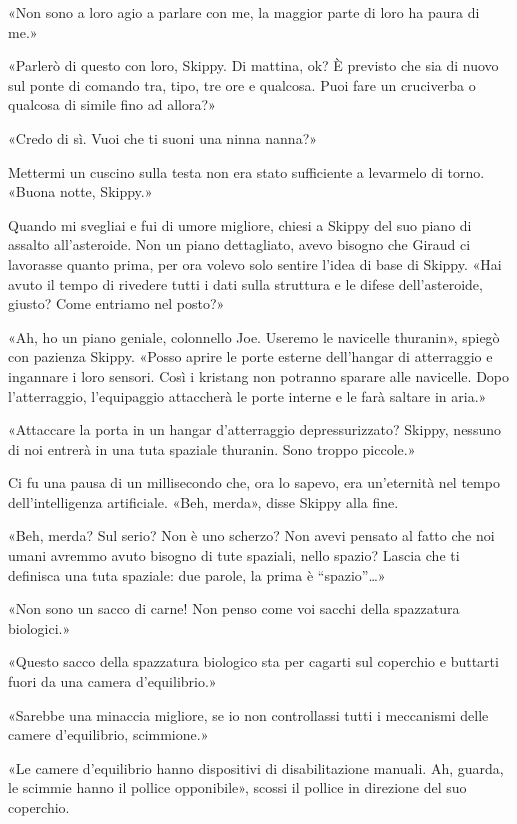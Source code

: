 «Non sono a loro agio a parlare con me, la maggior parte di loro ha
paura di me.»

«Parlerò di questo con loro, Skippy. Di mattina, ok? È previsto che sia
di nuovo sul ponte di comando tra, tipo, tre ore e qualcosa. Puoi fare
un cruciverba o qualcosa di simile fino ad allora?»

«Credo di sì. Vuoi che ti suoni una ninna nanna?»

Mettermi un cuscino sulla testa non era stato sufficiente a levarmelo di
torno. «Buona notte, Skippy.»

\hfill\break

Quando mi svegliai e fui di umore migliore, chiesi a Skippy del suo
piano di assalto all'asteroide. Non un piano dettagliato, avevo bisogno
che Giraud ci lavorasse quanto prima, per ora volevo solo sentire l'idea
di base di Skippy. «Hai avuto il tempo di rivedere tutti i dati sulla
struttura e le difese dell'asteroide, giusto? Come entriamo nel posto?»

«Ah, ho un piano geniale, colonnello Joe. Useremo le navicelle
thuranin», spiegò con pazienza Skippy. «Posso aprire le porte esterne
dell'hangar di atterraggio e ingannare i loro sensori. Così i kristang
non potranno sparare alle navicelle. Dopo l'atterraggio, l'equipaggio
attaccherà le porte interne e le farà saltare in aria.»

«Attaccare la porta in un hangar d'atterraggio depressurizzato? Skippy,
nessuno di noi entrerà in una tuta spaziale thuranin. Sono troppo
piccole.»

Ci fu una pausa di un millisecondo che, ora lo sapevo, era un'eternità
nel tempo dell'intelligenza artificiale. «Beh, merda», disse Skippy alla
fine.

«Beh, merda? Sul serio? Non è uno scherzo? Non avevi pensato al fatto
che noi umani avremmo avuto bisogno di tute spaziali, nello spazio?
Lascia che ti definisca una tuta spaziale: due parole, la prima è
``spazio''\ldots»

«Non sono un sacco di carne! Non penso come voi sacchi della spazzatura
biologici.»

«Questo sacco della spazzatura biologico sta per cagarti sul coperchio e
buttarti fuori da una camera d'equilibrio.»

«Sarebbe una minaccia migliore, se io non controllassi tutti i
meccanismi delle camere d'equilibrio, scimmione.»

«Le camere d'equilibrio hanno dispositivi di disabilitazione manuali.
Ah, guarda, le scimmie hanno il pollice opponibile», scossi il pollice
in direzione del suo coperchio.

